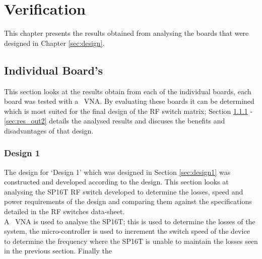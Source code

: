 \documentclass[12pt,openany,a4paper]{book}
\begin{document}
\chapter{Verification}		\label{chap:verification}
This chapter presents the results obtained from analysing the boards that were designed in Chapter \ref{sec:design}.
\section{Individual Board's}	\label{sec:indv_boards}
This section looks at the results obtain from each of the individual boards, each board was tested with a \model \ VNA. By evaluating these boards it can be determined which is most suited for the final design of the RF switch matrix; Section \ref{sec:res_des1} - \ref{sec:res_out2} details the analysed results and discuses the benefits and disadvantages of that design. 


\subsection{Design 1}	\label{sec:res_des1}
The design for `Design 1' which was designed in Section \ref{sec:design1} was constructed and developed according to the design. This section looks at analysing the SP16T RF switch developed to determine the losses, speed and power requirements of the design and comparing them against the specifications detailed in the RF switches data-sheet.\\
A \model \ VNA is used to analyse the SP16T; this is used to determine the losses of the system, the micro-controller is used to increment the switch speed of the device to determine the frequency where the SP16T is unable to maintain the losses seen in the previous section. Finally the 
 
\end{document}
